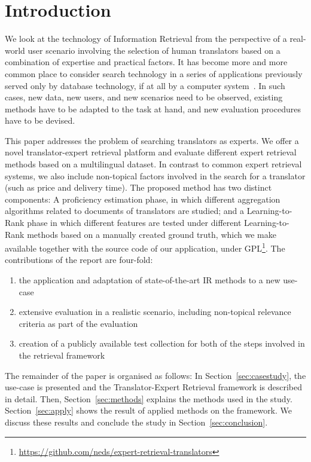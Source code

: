 \section{Introduction}
\label{sec:introduction}
We look at the technology of Information Retrieval from the perspective of a real-world user scenario involving the selection of human translators based on a combination of expertise and practical factors. 
It has become more and more common place to consider search technology in a series of applications previously served only by database technology, if at all by a computer system~\cite{Grefenstette:2011}. In such cases, new data, new users, and new scenarios need to be observed, existing methods have to be adapted to the task at hand, and new evaluation procedures have to be devised. 

This paper addresses the problem of searching translators as experts. We offer a novel translator-expert retrieval platform and evaluate different expert retrieval methods based on a multilingual dataset. In contrast to common expert retrieval systems, we also include non-topical factors involved in the search for a translator (such as price and delivery time).%
 The proposed method has two distinct components: A proficiency estimation phase, in which different aggregation algorithms related to documents of translators are studied; and a Learning-to-Rank phase in which different features are tested under different Learning-to-Rank methods based on a manually created ground truth, which we make available together with the source code of our application, under GPL\footnote{\url{https://github.com/neds/expert-retrieval-translators}}. The contributions of the report are four-fold:
\begin{enumerate}
\vspace{-0.3cm}
\item the application and adaptation of state-of-the-art IR methods to a new use-case
\item extensive evaluation in a realistic scenario, including non-topical relevance criteria as part of the evaluation
\item creation of a publicly available test collection for both of the steps involved in the retrieval framework
\vspace{-0.3cm}
\end{enumerate}

The remainder of the paper is organised as follows: In Section~\ref{sec:casestudy}, the use-case is presented and the Translator-Expert Retrieval framework is described in detail. Then, Section~\ref{sec:methods} explains the methods used in the study. Section~\ref{sec:apply} shows the result of applied methods on the framework. We discuss these results and conclude the study in Section~\ref{sec:conclusion}.
